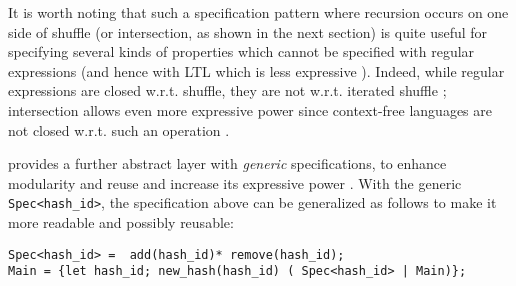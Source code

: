 It is worth noting that such a specification pattern where recursion occurs on one side of shuffle (or intersection, as shown in the next section)
is quite useful for specifying several kinds of properties \cite{RML2021} which cannot be specified with regular expressions (and hence
with LTL which is less expressive \cite{Strejcek2004}). Indeed, while regular expressions are closed w.r.t. shuffle, they are not
w.r.t. iterated shuffle \cite{FlickK12}; intersection allows even more expressive power since context-free languages are not closed w.r.t. such an operation \cite{RML2021}.


\rml provides a further abstract layer with \emph{generic} specifications,
to enhance modularity and reuse and increase its expressive power \cite{RML2021}.
With the generic \lstinline{Spec<hash_id>}, the specification above
can be generalized as follows to make it more readable and possibly reusable:
\begin{lstlisting}[basicstyle=\ttfamily\scriptsize]
Spec<hash_id> =  add(hash_id)* remove(hash_id); 
Main = {let hash_id; new_hash(hash_id) ( Spec<hash_id> | Main)};
\end{lstlisting}

